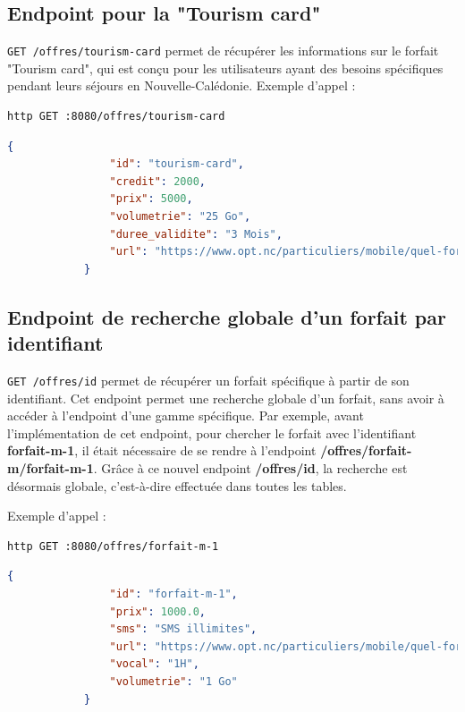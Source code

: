 \documentclass[11pt]{article}
\begin{document}
		\subsection*{Endpoint pour la "Tourism card"}
		\texttt{GET /offres/tourism-card} permet de récupérer les informations sur le forfait "Tourism card", qui est conçu pour les utilisateurs ayant des besoins spécifiques pendant leurs séjours en Nouvelle-Calédonie.
		Exemple d'appel :
		\begin{lstlisting}[language=bash]
			http GET :8080/offres/tourism-card
		\end{lstlisting}
		\begin{lstlisting}[language=JSON]
			{
				"id": "tourism-card",
				"credit": 2000,
				"prix": 5000,
				"volumetrie": "25 Go",
				"duree_validite": "3 Mois",
				"url": "https://www.opt.nc/particuliers/mobile/quel-forfait-choisir/tourism-card-1000"
			}
		\end{lstlisting}
		
	
		
		\subsection*{Endpoint de recherche globale d'un forfait par identifiant}
		
		\texttt{GET /offres/{id}} permet de récupérer un forfait spécifique à partir de son identifiant. Cet endpoint permet une recherche globale d'un forfait, sans avoir à accéder à l'endpoint d'une gamme spécifique. Par exemple, avant l'implémentation de cet endpoint, pour chercher le forfait avec l'identifiant \textbf{forfait-m-1}, il était nécessaire de se rendre à l'endpoint \textbf{/offres/forfait-m/forfait-m-1}. Grâce à ce nouvel endpoint \textbf{/offres/{id}}, la recherche est désormais globale, c'est-à-dire effectuée dans toutes les tables.
	
		
			Exemple d'appel :
		\begin{lstlisting}[language=bash]
			http GET :8080/offres/forfait-m-1
		\end{lstlisting}
		\begin{lstlisting}[language=JSON]
			{
				"id": "forfait-m-1",
				"prix": 1000.0,
				"sms": "SMS illimites",
				"url": "https://www.opt.nc/particuliers/mobile/quel-forfait-choisir/forfait-m-1-go",
				"vocal": "1H",
				"volumetrie": "1 Go"
			}
	
		\end{lstlisting}
		
		
		
\end{document}
